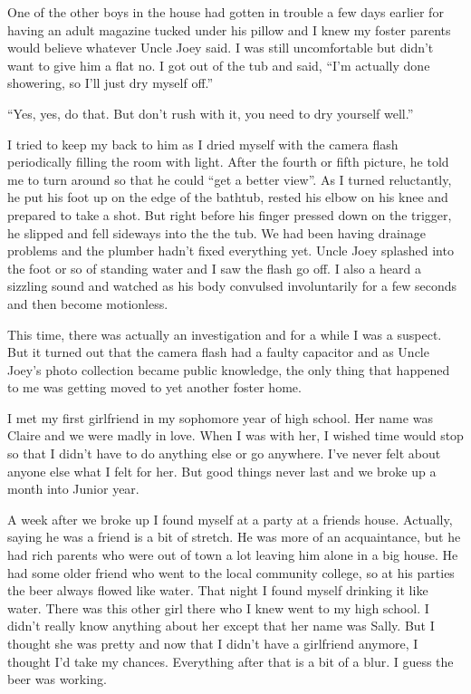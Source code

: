 \documentclass[11pt,letterpaper]{article}
\begin{document}
One of the other boys in the house had gotten in trouble a few days earlier for having an adult magazine tucked under his pillow and I knew my foster parents would believe whatever Uncle Joey said. I was still uncomfortable but didn't want to give him a flat no. I got out of the tub and said, ``I'm actually done showering, so I'll just dry myself off.''

``Yes, yes, do that. But don't rush with it, you need to dry yourself well.''

I tried to keep my back to him as I dried myself with the camera flash periodically filling the room with light. After the fourth or fifth picture, he told me to turn around so that he could ``get a better view''. As I turned reluctantly, he put his foot up on the edge of the bathtub, rested his elbow on his knee and prepared to take a shot. But right before his finger pressed down on the trigger, he slipped and fell sideways into the the tub. We had been having drainage problems and the plumber hadn't fixed everything yet. Uncle Joey splashed into the foot or so of standing water and I saw the flash go off. I also a heard a sizzling sound and watched as his body convulsed involuntarily for a few seconds and then become motionless.

This time, there was actually an investigation and for a while I was a suspect. But it turned out that the camera flash had a faulty capacitor and as Uncle Joey's photo collection became public knowledge, the only thing that happened to me was getting moved to yet another foster home.


I met my first girlfriend in my sophomore year of high school. Her name was Claire and we were madly in love. When I was with her, I wished time would stop so that I didn't have to do anything else or go anywhere. I've never felt about anyone else what I felt for her. But good things never last and we broke up a month into Junior year.

A week after we broke up I found myself at a party at a friends house. Actually, saying he was a friend is a bit of stretch. He was more of an acquaintance, but he had rich parents who were out of town a lot leaving him alone in a big house. He had some older friend who went to the local community college, so at his parties the beer always flowed like water. That night I found myself drinking it like water. There was this other girl there who I knew went to my high school. I didn't really know anything about her except that her name was Sally. But I thought she was pretty and now that I didn't have a girlfriend anymore, I thought I'd take my chances. Everything after that is a bit of a blur. I guess the beer was working.
\end{document}

